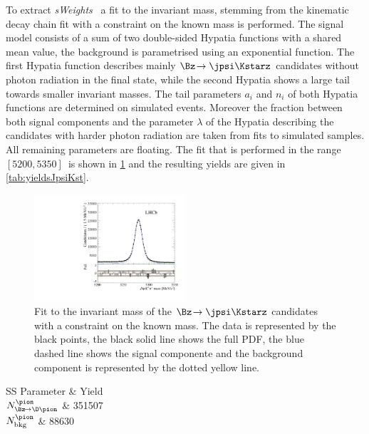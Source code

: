 To extract \emph{sWeights}~\cite{Pivk:2004ty} a fit to the invariant \Bz mass, stemming from the kinematic decay chain fit with a constraint on the known \jpsi mass is performed.
The signal model consists of a sum of two double-sided Hypatia functions with a shared mean value, the background is parametrised using an exponential function.
The first Hypatia function describes mainly $\Bz\!\to\jpsi\Kstarz$ candidates without photon radiation in the final state, while the second Hypatia shows a large tail towards smaller invariant masses.
The tail parameters $a_i$ and $n_i$ of both Hypatia functions are determined on simulated events.
Moreover the fraction between both signal components and the parameter $\lambda$ of the Hypatia describing the \Bz candidates with harder photon radiation are taken from fits to simulated samples.
All remaining parameters are floating.
The fit that is performed in the range $[5200, 5350]\,$\si[per-mode=symbol]{\MeVcc} is shown in \cref{fig:massFitJpsiKst} and the resulting yields are given in \cref{tab:yieldsJpsiKst}.
\begin{figure}[tbp]
    \centering
    \includegraphics[width=0.5\textwidth]{09FlavourTagging/figs/BmassJpsiKst_pull.pdf}
    \caption{Fit to the invariant mass of the $\Bz\!\to\jpsi\Kstarz$ candidates with a constraint on the known \jpsi mass.
    The data is represented by the black points, the black solid line shows the full PDF, the blue dashed line shows the signal componente and the background component is represented by the dotted yellow line.}
    \label{fig:massFitJpsiKst}
\end{figure}
\begin{table}[tbp]
	\centering
	\caption{Fitted Yields of the $\Bz\!\to\jpsi\Kstarz$ component and the combinatorial background.}
	\begin{tabular}{SS}
		\toprule
		{Parameter} & {Yield} \\
		\midrule
		{$N_{\Bz\!\to\D\pion}^{\pion}$}	& 351507 \\
		{$N_{\text{bkg}}^{\pion}$}		& 88630 \\
		\bottomrule
	\end{tabular}
	\label{tab:yieldsJpsiKst}
\end{table}

